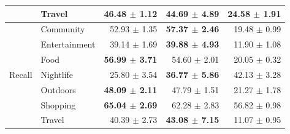 \begin{table}[htbp]
\begin{tabular}{llrrr}
                           & Travel        & \textbf{46.48 $\pm$ 1.12} & 44.69 $\pm$ 4.89          & 24.58 $\pm$ 1.91 \\
\midrule
\multirow{7}{*}{Recall}    & Community     & 52.93 $\pm$ 1.35          & \textbf{57.37 $\pm$ 2.46} & 19.48 $\pm$ 0.99 \\
                           & Entertainment & 39.14 $\pm$ 1.69          & \textbf{39.88 $\pm$ 4.93} & 11.90 $\pm$ 1.08 \\
                           & Food          & \textbf{56.99 $\pm$ 3.71} & 54.60 $\pm$ 2.01          & 20.05 $\pm$ 0.32 \\
                           & Nightlife     & 25.80 $\pm$ 3.54          & \textbf{36.77 $\pm$ 5.86} & 42.13 $\pm$ 3.28 \\
                           & Outdoors      & \textbf{48.09 $\pm$ 2.11} & 47.79 $\pm$ 1.51          & 21.27 $\pm$ 1.78 \\
                           & Shopping      & \textbf{65.04 $\pm$ 2.69} & 62.28 $\pm$ 2.83          & 56.82 $\pm$ 0.98 \\
                           & Travel        & 40.39 $\pm$ 2.73          & \textbf{43.08 $\pm$ 7.15} & 11.07 $\pm$ 0.95 \\
\bottomrule
\end{tabular}
\end{table}

